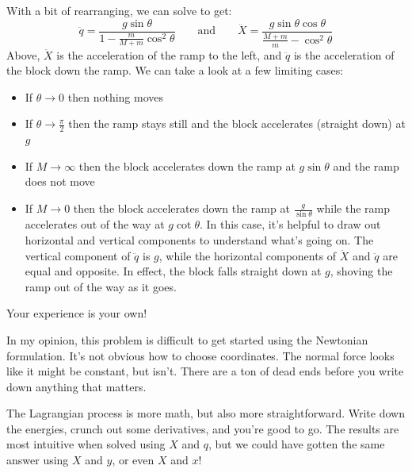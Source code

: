 \documentclass[12pt]{article}
\begin{document}
{With a bit of rearranging, we can solve to get:
$$
\ddot{q} = \frac{g\sin\theta}{1 - \tfrac{m}{M+m} \cos^2\theta}
\quad \quad \text{and} \quad \quad
\ddot{X} = \frac{g \sin\theta \cos\theta}{ \tfrac{M + m}{m} - \cos^2\theta}
$$
Above, $\ddot{X}$ is the acceleration of the ramp to the left, and $\ddot{q}$ is the acceleration of the block down the ramp. We can take a look at a few limiting cases:
\begin{itemize}
    \item If $\theta \rightarrow 0$ then nothing moves
    \item If $\theta \rightarrow \tfrac{\pi}{2}$ then the ramp stays still and the block accelerates (straight down) at $g$
    \item If $M\rightarrow \infty$ then the block accelerates down the ramp at $g\sin\theta$ and the ramp does not move
    \item If $M \rightarrow 0$ then the block accelerates down the ramp at $\frac{g}{\sin\theta}$ while the ramp accelerates out of the way at $g\cot\theta$. In this case, it's helpful to draw out horizontal and vertical components to understand what's going on. The vertical component of $\ddot{q}$ is $g$, while the horizontal components of $\ddot{X}$ and $\ddot{q}$ are equal and opposite. In effect, the block falls straight down at $g$, shoving the ramp out of the way as it goes. 
\end{itemize}
Your experience is your own! 

In my opinion, this problem is difficult to get started using the Newtonian formulation. It's not obvious how to choose coordinates. The normal force looks like it might be constant, but isn't. There are a ton of dead ends before you write down anything that matters.

The Lagrangian process is more math, but also more straightforward. Write down the energies, crunch out some derivatives, and you're good to go. The results are most intuitive when solved using $X$ and $q$, but we could have gotten the same answer using $X$ and $y$, or even $X$ and $x$! 

}
\end{document}
